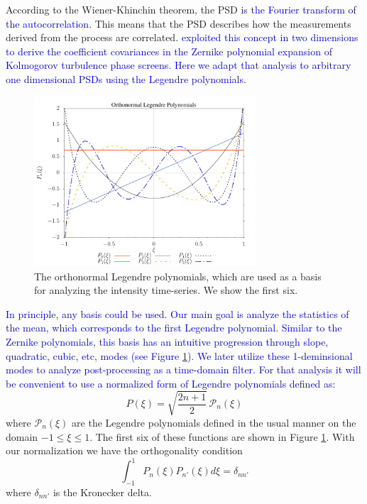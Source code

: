 \documentclass[10pt,preprint]{aastex631}
\newcommand{\jrmadd}[1]{\textcolor{blue}{#1}}
\begin{document}
According to the Wiener-Khinchin theorem, the PSD \jrmadd{is the Fourier transform of the autocorrelation}.  This means that the PSD describes how the measurements derived from the process are correlated. \jrmadd{\citet{1976JOSA...66..207N} exploited this concept in two dimensions to derive the coefficient covariances in the Zernike polynomial expansion of Kolmogorov turbulence phase screens.  Here we adapt that analysis to arbitrary one dimensional PSDs using the Legendre polynomials.}  

\begin{figure}[h]
    \centering
    \includegraphics[width=3.25in]{onLegPol.pdf}
    \caption{The orthonormal Legendre polynomials, which are used as a basis for analyzing the intensity time-series.  We show the first six. \label{fig:onlegpol}}
\end{figure}

\jrmadd{In principle, any basis could be used.  Our main goal is analyze the statistics of the mean, which corresponds to the first Legendre polynomial.  Similar to the Zernike polynomials, this basis has an intuitive progression through slope, quadratic, cubic, etc, modes (see Figure \ref{fig:onlegpol}). We later utilize these 1-deminsional modes to analyze post-processing as a time-domain filter.  For that analysis it will be convenient to use a normalized form of Legendre polynomials defined as:}
\begin{equation}
P(\xi) = \sqrt{\frac{2n+1}{2}}\, \mathscr{P}_n(\xi)
\label{eqn:basis}
\end{equation}
where $\mathscr{P}_n(\xi)$ are the Legendre polynomials defined in the usual manner \citep[cf.][]{Olver:2010:NHMF} on the domain $-1 \le \xi \le 1$. The first six of these functions are shown in Figure \ref{fig:onlegpol}.  With our normalization we have the orthogonality condition
\begin{equation}
\int_{-1}^{1}P_n(\xi)P_{n'}(\xi) d\xi = \delta_{nn'}
\label{eqn:orthonormal}
\end{equation}
where $\delta_{nn'}$ is the Kronecker delta. 
\end{document}
